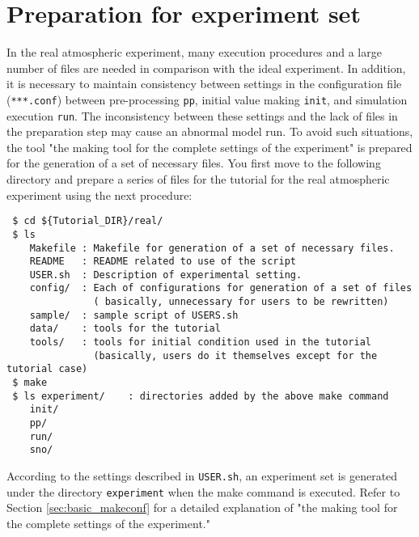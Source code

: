 \section{Preparation for experiment set} \label{sec:tutorial_real_prep}

In the real atmospheric experiment,
many execution procedures and a large number of files are needed in comparison with the ideal experiment.
In addition, it is necessary to maintain consistency between settings in the configuration file (\verb|***.conf|)
between pre-processing \verb|pp|, initial value making \verb|init|, and simulation execution \verb|run|.
The inconsistency between these settings and the lack of files in the preparation step may cause an abnormal model run.
To avoid such situations, the tool "the making tool for the complete settings of the experiment"
is prepared for the generation of a set of necessary files.
You first move to the following directory and prepare a series of files for the tutorial for the real atmospheric experiment using the next procedure:
\begin{verbatim}
 $ cd ${Tutorial_DIR}/real/
 $ ls
    Makefile : Makefile for generation of a set of necessary files.
    README   : README related to use of the script
    USER.sh  : Description of experimental setting.
    config/  : Each of configurations for generation of a set of files
               ( basically, unnecessary for users to be rewritten)
    sample/  : sample script of USERS.sh
    data/    : tools for the tutorial
    tools/   : tools for initial condition used in the tutorial 
               (basically, users do it themselves except for the tutorial case)
 $ make
 $ ls experiment/    : directories added by the above make command
    init/
    pp/
    run/
    sno/
\end{verbatim}

According to the settings described in \verb|USER.sh|,
an experiment set is generated under the directory \verb|experiment| when the make command is executed.
Refer to Section \ref{sec:basic_makeconf} for a detailed explanation of "the making tool for the complete settings of the experiment."

